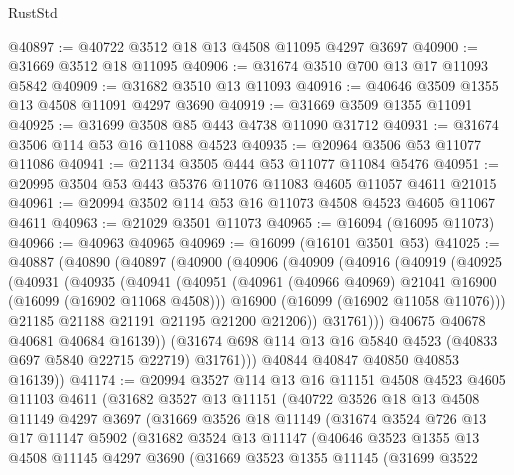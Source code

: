 \begin{lexlean}{RustStd}
\begin{coremodule}
@40897 := @40722 @3512 @18 @13 @4508 @11095 @4297 @3697
@40900 := @31669 @3512 @18 @11095
@40906 := @31674 @3510 @700 @13 @17 @11093 @5842
@40909 := @31682 @3510 @13 @11093
@40916 := @40646 @3509 @1355 @13 @4508 @11091 @4297 @3690
@40919 := @31669 @3509 @1355 @11091
@40925 := @31699 @3508 @85 @443 @4738 @11090 @31712
@40931 := @31674 @3506 @114 @53 @16 @11088 @4523
@40935 := @20964 @3506 @53 @11077 @11086
@40941 := @21134 @3505 @444 @53 @11077 @11084 @5476
@40951 := @20995 @3504 @53 @443 @5376 @11076 @11083 @4605 @11057 @4611 @21015
@40961 := @20994 @3502 @114 @53 @16 @11073 @4508 @4523 @4605 @11067 @4611
@40963 := @21029 @3501 @11073
@40965 := @16094 (@16095 @11073)
@40966 := @40963 @40965
@40969 := @16099 (@16101 @3501 @53)
@41025 := @40887
    (@40890
      (@40897
        (@40900
          (@40906
            (@40909
              (@40916
                (@40919
                  (@40925
                    (@40931
                      (@40935
                        (@40941
                          (@40951
                            (@40961 (@40966 @40969) @21041 @16900 (@16099 (@16902 @11068 @4508)))
                            @16900
                            (@16099 (@16902 @11058 @11076)))
                          @21185
                          @21188
                          @21191
                          @21195
                          @21200
                          @21206))
                      @31761)))
                @40675
                @40678
                @40681
                @40684
                @16139))
            (@31674 @698 @114 @13 @16 @5840 @4523 (@40833 @697 @5840 @22715 @22719) @31761)))
        @40844
        @40847
        @40850
        @40853
        @16139))
@41174 := @20994
    @3527
    @114
    @13
    @16
    @11151
    @4508
    @4523
    @4605
    @11103
    @4611
    (@31682
      @3527
      @13
      @11151
      (@40722
        @3526
        @18
        @13
        @4508
        @11149
        @4297
        @3697
        (@31669
          @3526
          @18
          @11149
          (@31674
            @3524
            @726
            @13
            @17
            @11147
            @5902
            (@31682
              @3524
              @13
              @11147
              (@40646
                @3523
                @1355
                @13
                @4508
                @11145
                @4297
                @3690
                (@31669
                  @3523
                  @1355
                  @11145
                  (@31699
                    @3522

\end{coremodule}
\end{lexlean}
